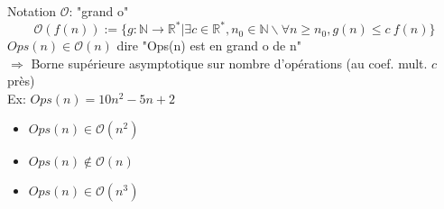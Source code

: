 \documentclass{article}
\begin{document}
\begin{preview}
Notation $\mathcal{O}$: "grand o"
    $$\mathcal{O}(f(n)) := \{g: \mathbb{N} \rightarrow \mathbb{R}^* | \exists c \in \mathbb{R}^*, n_0 \in \mathbb{N} \backslash \forall n \geq n_0, g(n) \leq c~f(n)\}$$
    $Ops(n) \in \mathcal{O}(n)$ dire "Ops(n) est en grand o de n"\\
    $\Rightarrow$ Borne supérieure asymptotique sur nombre d'opérations (au coef. mult. $c$ près)\\
    Ex:  $Ops(n) = 10 n^2 - 5 n + 2$
    \begin{minipage}{0.5\textwidth}
    \begin{itemize}
        \item $Ops(n) \in \mathcal{O}(n^2)$
        \item $Ops(n) \not\in \mathcal{O}(n)$
        \item $Ops(n) \in \mathcal{O}(n^3)$
    \end{itemize}
    \end{minipage}
 \end{preview}
\end{document}
